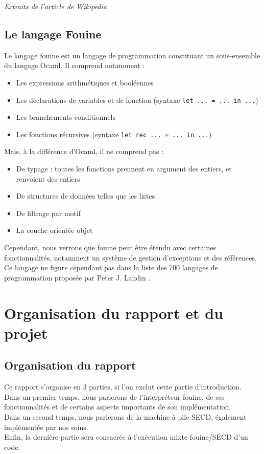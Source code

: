 \textit{Extraits de l'article de Wikipedia \cite{WikiFouine}}

\subsection{Le langage Fouine}

Le langage fouine est un langage de programmation constituant un sous-ensemble du langage Ocaml. Il comprend notamment :
\begin{itemize}
 \item Les expressions arithmétiques et booléennes
 \item Les déclarations de variables et de fonction (syntaxe \texttt{let ... = ... in ...})
 \item Les branchements conditionnels
 \item Les fonctions récursives (syntaxe \texttt{let rec ... = ... in ...})
\end{itemize}

Mais, à la différence d'Ocaml, il ne comprend pas :
\begin{itemize}
 \item De typage : toutes les fonctions prennent en argument des entiers, et renvoient des entiers
 \item De structures de données telles que les listes
 \item De filtrage par motif
 \item La couche orientée objet
\end{itemize}

Cependant, nous verrons que fouine peut être étendu avec certaines fonctionnalités, notamment un système de gestion d'exceptions et des références.\\
Ce langage ne figure cependant pas dans la liste des 700 langages de programmation proposée par Peter J. Landin \cite{700}.

\section{Organisation du rapport et du projet}

\subsection{Organisation du rapport}

Ce rapport s'organise en 3 parties, si l'on exclut cette partie d'introduction. \\
Dans un premier temps, nous parlerons de l'interpréteur fouine, de ses fonctionnalités et de certains aspects importants de son implémentation. \\
Dans un second temps, nous parlerons de la machine à pile SECD, également implémentée par nos soins. \\
Enfin, la dernière partie sera consacrée à l'exécution mixte fouine/SECD d'un code.

